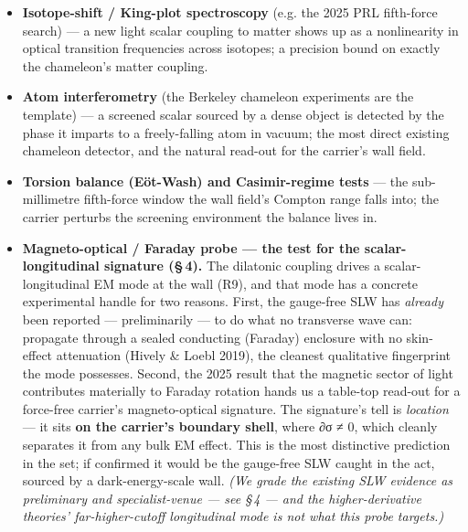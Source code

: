 \documentclass[11pt]{article}
\begin{document}
\begin{itemize}
\item \textbf{Isotope-shift / King-plot spectroscopy} (e.g. the 2025 PRL fifth-force search) --- a new light scalar coupling to matter shows up as a nonlinearity in optical transition frequencies across isotopes; a precision bound on exactly the chameleon's matter coupling.
\item \textbf{Atom interferometry} (the Berkeley chameleon experiments are the template) --- a screened scalar sourced by a dense object is detected by the phase it imparts to a freely-falling atom in vacuum; the most direct existing chameleon detector, and the natural read-out for the carrier's wall field.
\item \textbf{Torsion balance (Eöt-Wash) and Casimir-regime tests} --- the sub-millimetre fifth-force window the wall field's Compton range falls into; the carrier perturbs the screening environment the balance lives in.
\item \textbf{Magneto-optical / Faraday probe --- the test for the scalar-longitudinal signature (\S\,4).} The dilatonic coupling drives a scalar-longitudinal EM mode at the wall (R9), and that mode has a concrete experimental handle for two reasons. First, the gauge-free SLW has \emph{already} been reported --- preliminarily --- to do what no transverse wave can: propagate through a sealed conducting (Faraday) enclosure with no skin-effect attenuation (Hively \& Loebl 2019), the cleanest qualitative fingerprint the mode possesses. Second, the 2025 result that the magnetic sector of light contributes materially to Faraday rotation hands us a table-top read-out for a force-free carrier's magneto-optical signature. The signature's tell is \emph{location} --- it sits \textbf{on the carrier's boundary shell}, where ∂σ ≠ 0, which cleanly separates it from any bulk EM effect. This is the most distinctive prediction in the set; if confirmed it would be the gauge-free SLW caught in the act, sourced by a dark-energy-scale wall. \emph{(We grade the existing SLW evidence as preliminary and specialist-venue --- see \S\,4 --- and the higher-derivative theories' far-higher-cutoff longitudinal mode is not what this probe targets.)}

\end{itemize}
\end{document}
